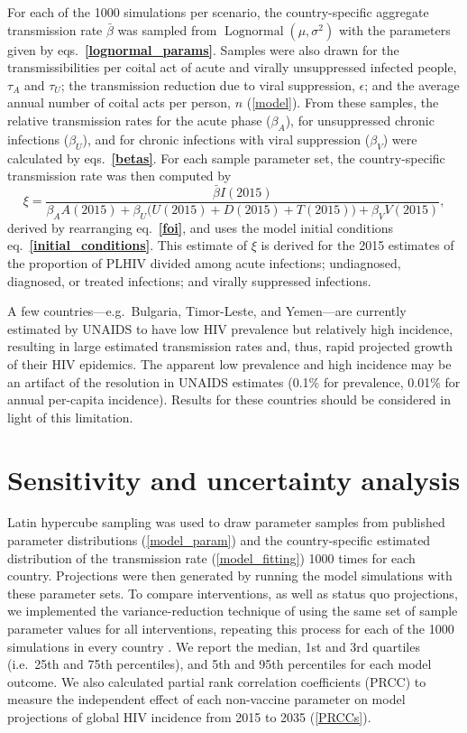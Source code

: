 \documentclass{article}
\renewcommand{\eqref}[1]{\textbf{\ref{#1}}}
\DeclareMathOperator{\Lognormal}{Lognormal}
\begin{document}
For each of the 1000 simulations per scenario, the country-specific
aggregate transmission rate $\bar{\beta}$ was sampled from
$\Lognormal(\mu, \sigma^2)$ with the parameters given by
eqs.~\eqref{lognormal_params}. Samples were also drawn for the
transmissibilities per coital act of acute and virally unsuppressed
infected people, $\tau_A$ and $\tau_U$; the transmission reduction due
to viral suppression, $\epsilon$; and the average annual number of
coital acts per person, $n$ (\autoref{model}).  From these samples,
the relative transmission rates for the acute phase ($\beta_A$), for
unsuppressed chronic infections ($\beta_U$), and for chronic
infections with viral suppression ($\beta_V$) were calculated by
eqs.~\eqref{betas}.  For each sample parameter set, the
country-specific transmission rate was then computed by
\begin{equation}
  \label{eta}
  \xi = \frac{\bar{\beta} I(2015)}{
    \beta_A A(2015) + \beta_U \big(U(2015) + D(2015) + T(2015)\big)
    + \beta_V V(2015)},
\end{equation}
derived by rearranging eq.~\eqref{foi}, and uses the model initial
conditions eq.~\eqref{initial_conditions}.  This estimate of $\xi$ is
derived for the 2015 estimates of the proportion of PLHIV divided
among acute infections; undiagnosed, diagnosed, or treated infections;
and virally suppressed infections.

A few countries—e.g.~Bulgaria, Timor-Leste, and Yemen—are currently
estimated by UNAIDS to have low HIV prevalence but relatively high
incidence, resulting in large estimated transmission rates and, thus,
rapid projected growth of their HIV epidemics. The apparent low
prevalence and high incidence may be an artifact of the resolution in
UNAIDS estimates (0.1\% for prevalence, 0.01\% for annual per-capita
incidence).  Results for these countries should be considered in light
of this limitation.


\section{Sensitivity and uncertainty analysis}
\label{uncertainty}

Latin hypercube sampling \cite{blower1994} was used to draw parameter
samples from published parameter distributions (\autoref{model_param})
and the country-specific estimated distribution of the transmission
rate (\autoref{model_fitting}) 1000 times for each country.
Projections were then generated by running the model simulations with
these parameter sets.  To compare interventions, as well as status quo
projections, we implemented the variance-reduction technique of using
the same set of sample parameter values for all interventions,
repeating this process for each of the 1000 simulations in every
country \cite{shechter2006}.  We report the median, 1st and 3rd
quartiles (i.e.~25th and 75th percentiles), and 5th and 95th
percentiles for each model outcome.  We also calculated partial rank
correlation coefficients (PRCC) \cite{blower1994} to measure the
independent effect of each non-vaccine parameter on model projections
of global HIV incidence from 2015 to 2035 (\autoref{PRCCs}).
\end{document}
